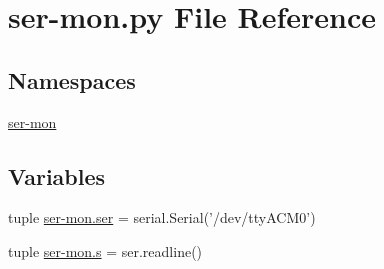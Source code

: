 \hypertarget{ser-mon_8py}{\section{ser-\/mon.py File Reference}
\label{ser-mon_8py}
}
\subsection*{Namespaces}
\begin{DoxyCompactItemize}
\item 
\hyperlink{namespaceser-mon}{ser-\/mon}
\end{DoxyCompactItemize}
\subsection*{Variables}
\begin{DoxyCompactItemize}
\item 
tuple \hyperlink{namespaceser-mon_a172fe4d911910417504386161b9d1891}{ser-\/mon.\-ser} = serial.\-Serial('/dev/tty\-A\-C\-M0')
\item 
tuple \hyperlink{namespaceser-mon_a37e0cdc510e97e5ed77ef9606c5659f0}{ser-\/mon.\-s} = ser.\-readline()
\end{DoxyCompactItemize}
